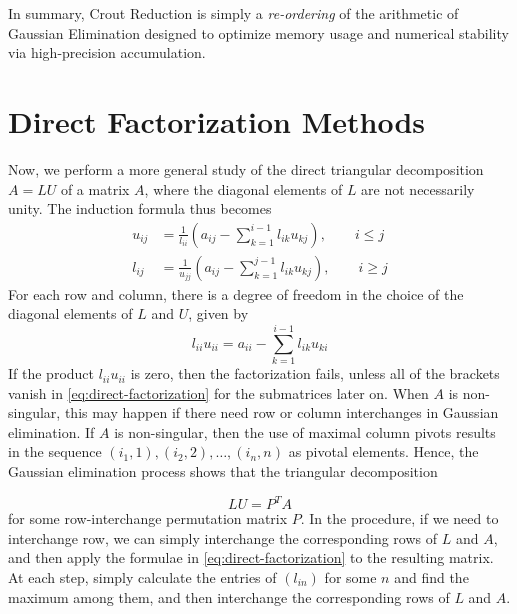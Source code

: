 \documentclass[../main.tex]{subfiles}
\begin{document}
\begin{remark}
	In summary, Crout Reduction is simply a \textit{re-ordering} of the arithmetic of Gaussian Elimination designed to optimize memory usage and numerical stability via high-precision accumulation.
\end{remark}

\section{Direct Factorization Methods}

Now, we perform a more general study of the direct triangular decomposition $A = L U$ of a matrix $A$, where the diagonal elements of $L$ are not necessarily unity. The induction formula thus becomes
\begin{equation} \label{eq:direct-factorization}
	\begin{aligned}
		u_{ij} & = \frac{1}{l_{ii}} \left( a_{ij} - \sum_{k=1}^{i-1} l_{ik} u_{kj} \right), \qquad i \leq j \\
		l_{ij} & = \frac{1}{u_{jj}} \left( a_{ij} - \sum_{k=1}^{j-1} l_{ik} u_{kj} \right), \qquad i \geq j
	\end{aligned}
\end{equation}
For each row and column, there is a degree of freedom in the choice of the diagonal elements of $L$ and $U$, given by
\begin{equation*}
	l_{ii} u_{ii} = a_{ii} - \sum_{k=1}^{i-1} l_{ik} u_{ki}
\end{equation*}
If the product $l_{ii} u_{ii}$ is zero, then the factorization fails, unless all of the brackets vanish in \eqref{eq:direct-factorization} for the submatrices later on. When $A$ is non-singular, this may happen if there need row or column interchanges in Gaussian elimination. If $A$ is non-singular, then the use of maximal column pivots results in the sequence $(i_1, 1), (i_2, 2), \ldots, (i_n, n)$ as pivotal elements. Hence, the Gaussian elimination process shows that the triangular decomposition

\begin{equation*}
	L U = P^T A
\end{equation*}
for some row-interchange permutation matrix $P$. In the procedure, if we need to interchange row, we can simply interchange the corresponding rows of $L$ and $A$, and then apply the formulae in \eqref{eq:direct-factorization} to the resulting matrix. At each step, simply calculate the entries of $(l_{in})$ for some $n$ and find the maximum among them, and then interchange the corresponding rows of $L$ and $A$.
\end{document}
